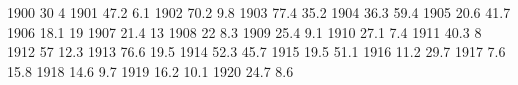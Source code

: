 1900 30 4
1901 47.2 6.1
1902 70.2 9.8
1903 77.4 35.2
1904 36.3 59.4
1905 20.6 41.7
1906 18.1 19
1907 21.4 13
1908 22 8.3
1909 25.4 9.1
1910 27.1 7.4
1911 40.3 8
1912 57 12.3
1913 76.6 19.5
1914 52.3 45.7
1915 19.5 51.1
1916 11.2 29.7
1917 7.6 15.8
1918 14.6 9.7
1919 16.2 10.1
1920 24.7 8.6
